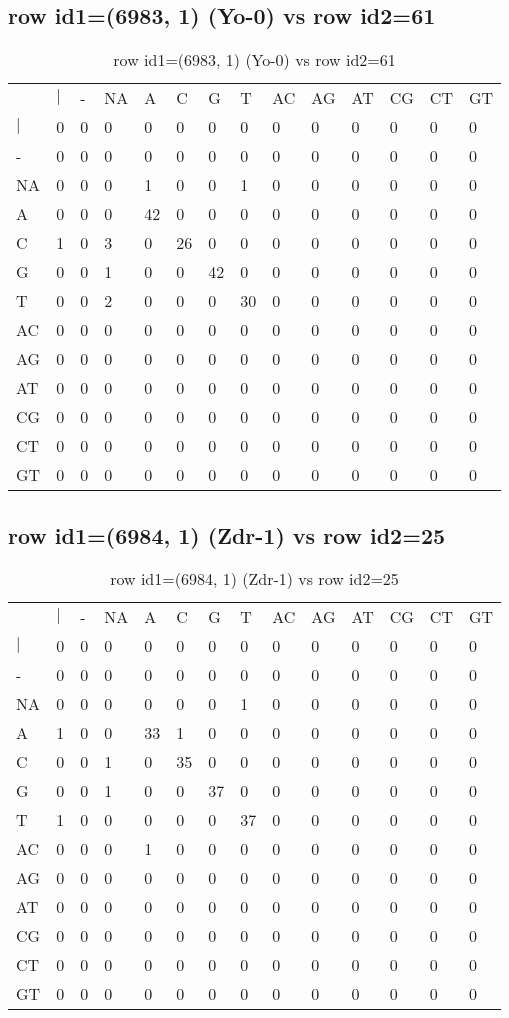 \subsection{row id1=(6983, 1) (Yo-0) vs row id2=61}
\begin{center}
\begin{longtable}{|l|l|l|l|l|l|l|l|l|l|l|l|l|l|}
\caption{row id1=(6983, 1) (Yo-0) vs row id2=61} \label{table_dm214}\\
\hline
\\
\hline
&$|$&-&NA&A&C&G&T&AC&AG&AT&CG&CT&GT\\
$|$&0&0&0&0&0&0&0&0&0&0&0&0&0\\
-&0&0&0&0&0&0&0&0&0&0&0&0&0\\
NA&0&0&0&1&0&0&1&0&0&0&0&0&0\\
A&0&0&0&42&0&0&0&0&0&0&0&0&0\\
C&1&0&3&0&26&0&0&0&0&0&0&0&0\\
G&0&0&1&0&0&42&0&0&0&0&0&0&0\\
T&0&0&2&0&0&0&30&0&0&0&0&0&0\\
AC&0&0&0&0&0&0&0&0&0&0&0&0&0\\
AG&0&0&0&0&0&0&0&0&0&0&0&0&0\\
AT&0&0&0&0&0&0&0&0&0&0&0&0&0\\
CG&0&0&0&0&0&0&0&0&0&0&0&0&0\\
CT&0&0&0&0&0&0&0&0&0&0&0&0&0\\
GT&0&0&0&0&0&0&0&0&0&0&0&0&0\\
\hline
\end{longtable}
\end{center}

\subsection{row id1=(6984, 1) (Zdr-1) vs row id2=25}
\begin{center}
\begin{longtable}{|l|l|l|l|l|l|l|l|l|l|l|l|l|l|}
\caption{row id1=(6984, 1) (Zdr-1) vs row id2=25} \label{table_dm216}\\
\hline
\\
\hline
&$|$&-&NA&A&C&G&T&AC&AG&AT&CG&CT&GT\\
$|$&0&0&0&0&0&0&0&0&0&0&0&0&0\\
-&0&0&0&0&0&0&0&0&0&0&0&0&0\\
NA&0&0&0&0&0&0&1&0&0&0&0&0&0\\
A&1&0&0&33&1&0&0&0&0&0&0&0&0\\
C&0&0&1&0&35&0&0&0&0&0&0&0&0\\
G&0&0&1&0&0&37&0&0&0&0&0&0&0\\
T&1&0&0&0&0&0&37&0&0&0&0&0&0\\
AC&0&0&0&1&0&0&0&0&0&0&0&0&0\\
AG&0&0&0&0&0&0&0&0&0&0&0&0&0\\
AT&0&0&0&0&0&0&0&0&0&0&0&0&0\\
CG&0&0&0&0&0&0&0&0&0&0&0&0&0\\
CT&0&0&0&0&0&0&0&0&0&0&0&0&0\\
GT&0&0&0&0&0&0&0&0&0&0&0&0&0\\
\hline
\end{longtable}
\end{center}

